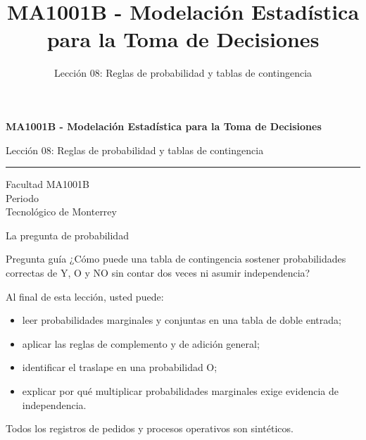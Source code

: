 \documentclass[aspectratio=169,10pt,spanish]{beamer}
\title{MA1001B - Modelación Estadística para la Toma de Decisiones}
\subtitle{Lección 08: Reglas de probabilidad y tablas de contingencia}
\author{}
\institute{Tecnol\'ogico de Monterrey}
\date{}
\begin{document}
\begin{frame}[plain]
  \vspace{1.2cm}
  {\Large\bfseries MA1001B - Modelación Estadística para la Toma de Decisiones\par}
  \vspace{0.7cm}
  {\large Lección 08: Reglas de probabilidad y tablas de contingencia\par}
  \vspace{0.7cm}
  {\color{TecRojo}\rule{\textwidth}{1.2pt}}
  \vspace{0.8cm}

  Facultad MA1001B\\[0.3cm]
  Periodo\\[0.3cm]
  Tecnol\'ogico de Monterrey
\end{frame}

\begin{frame}{La pregunta de probabilidad}
  \begin{alertblock}{Pregunta guía}
    ¿Cómo puede una tabla de contingencia sostener probabilidades correctas de
    Y, O y NO sin contar dos veces ni asumir independencia?
  \end{alertblock}

  \vspace{0.4em}
  Al final de esta lección, usted puede:
  \begin{itemize}
    \item leer probabilidades marginales y conjuntas en una tabla de doble entrada;
    \item aplicar las reglas de complemento y de adición general;
    \item identificar el traslape en una probabilidad O;
    \item explicar por qué multiplicar probabilidades marginales exige evidencia
      de independencia.
  \end{itemize}

  \vfill
  \scriptsize Todos los registros de pedidos y procesos operativos son sintéticos.
\end{frame}
\end{document}
